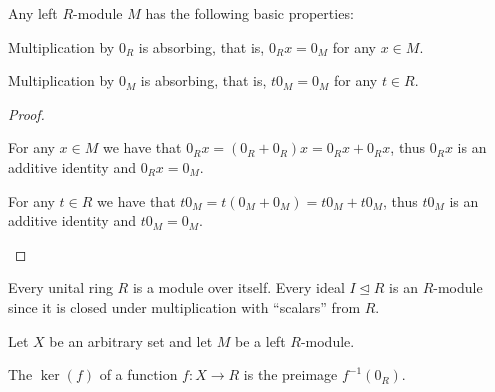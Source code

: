 \begin{proposition}\label{def:left_module_properties}
  Any left \( R \)-module \( M \) has the following basic properties:
  \begin{thmenum}
     Multiplication by \( 0_R \) is absorbing, that is, \( 0_R x = 0_M \) for any \( x \in M \).

     Multiplication by \( 0_M \) is absorbing, that is, \( t 0_M = 0_M \) for any \( t \in R \).
  \end{thmenum}
\end{proposition}
\begin{proof}\mbox{}
  \begin{itemize}
     For any \( x \in M \) we have that \( 0_R x = (0_R + 0_R)x = 0_R x + 0_R x \), thus \( 0_R x \) is an additive identity and \( 0_R x = 0_M \).

     For any \( t \in R \) we have that \( t 0_M = t (0_M + 0_M) = t 0_M + t 0_M \), thus \( t 0_M \) is an additive identity and \( t 0_M = 0_M \).
  \end{itemize}
\end{proof}

\begin{example}\label{ex:module/ideal_of_ring}
  Every unital ring \( R \) is a module over itself. Every ideal \( I \unlhd R \) is an \( R \)-module since it is closed under multiplication with \enquote{scalars} from \( R \).
\end{example}

\begin{definition}\label{def:left_module_kernel}
  Let \( X \) be an arbitrary set and let \( M \) be a left \( R \)-module.

  The  \( \ker(f) \) of a function \( f: X \to R \) is the preimage \( f^{-1}(0_R) \).
\end{definition}

